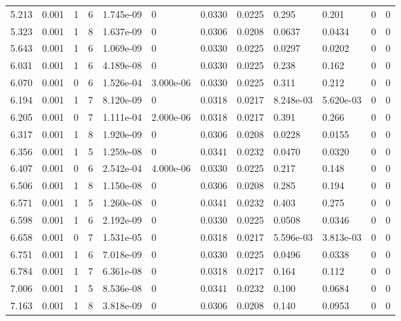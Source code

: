\documentclass[preview]{standalone}
\begin{document}
{{{\begin{tabular}{L{1.2cm}C{1.2cm} C{0.3cm}C{0.5cm} C{1.4cm}C{1.4cm} C{1.4cm}C{1.4cm} C{1.6cm}C{1.6cm} C{1.6cm}C{1.6cm}}
  5.213  &  0.001  & 1     &  6 &  1.745e-09  & 0  &  0.0330&   0.0225& 0.295 & 0.201   &  0 & 0  \\ 
  5.323  &  0.001  & 1     &  8 &  1.637e-09  & 0  &  0.0306&   0.0208& 0.0637 & 0.0434   &  0 & 0  \\ 
  5.643  &  0.001  & 1     &  6 &  1.069e-09  & 0  &  0.0330&   0.0225& 0.0297 & 0.0202   &  0 & 0  \\ 
  6.031  &  0.001  & 1     &  6 &  4.189e-08  & 0  &  0.0330&   0.0225& 0.238 & 0.162   &  0 & 0  \\ 
  6.070  &  0.001  & 0     &  6 &  1.526e-04  & 3.000e-06  &  0.0330&   0.0225& 0.311 & 0.212   &  0 & 0  \\ 
  6.194  &  0.001  & 1     &  7 &  8.120e-09  & 0  &  0.0318&   0.0217& 8.248e-03 & 5.620e-03   &  0 & 0  \\ 
  6.205  &  0.001  & 0     &  7 &  1.111e-04  & 2.000e-06  &  0.0318&   0.0217& 0.391 & 0.266   &  0 & 0  \\ 
  6.317  &  0.001  & 1     &  8 &  1.920e-09  & 0  &  0.0306&   0.0208& 0.0228 & 0.0155   &  0 & 0  \\ 
  6.356  &  0.001  & 1     &  5 &  1.259e-08  & 0  &  0.0341&   0.0232& 0.0470 & 0.0320   &  0 & 0  \\ 
  6.407  &  0.001  & 0     &  6 &  2.542e-04  & 4.000e-06  &  0.0330&   0.0225& 0.217 & 0.148   &  0 & 0  \\ 
  6.506  &  0.001  & 1     &  8 &  1.150e-08  & 0  &  0.0306&   0.0208& 0.285 & 0.194   &  0 & 0  \\ 
  6.571  &  0.001  & 1     &  5 &  1.260e-08  & 0  &  0.0341&   0.0232& 0.403 & 0.275   &  0 & 0  \\ 
  6.598  &  0.001  & 1     &  6 &  2.192e-09  & 0  &  0.0330&   0.0225& 0.0508 & 0.0346   &  0 & 0  \\ 
  6.658  &  0.001  & 0     &  7 &  1.531e-05  & 0  &  0.0318&   0.0217& 5.596e-03 & 3.813e-03   &  0 & 0  \\ 
  6.751  &  0.001  & 1     &  6 &  7.018e-09  & 0  &  0.0330&   0.0225& 0.0496 & 0.0338   &  0 & 0  \\ 
  6.784  &  0.001  & 1     &  7 &  6.361e-08  & 0  &  0.0318&   0.0217& 0.164 & 0.112   &  0 & 0  \\ 
  7.006  &  0.001  & 1     &  5 &  8.536e-08  & 0  &  0.0341&   0.0232& 0.100 & 0.0684   &  0 & 0  \\ 
  7.163  &  0.001  & 1     &  8 &  3.818e-09  & 0  &  0.0306&   0.0208& 0.140 & 0.0953   &  0 & 0  \\ 

\end{tabular}}}}
\end{document}
